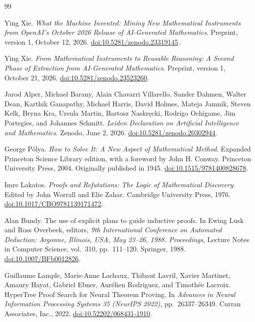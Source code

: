 \begin{thebibliography}{99}

Ying Xie.
\emph{What the Machine Invented: Mining New Mathematical Instruments from OpenAI's October 2026 Release of AI-Generated Mathematics}.
Preprint, version 1, October 12, 2026.
\href{https://doi.org/10.5281/zenodo.23319145}{doi:10.5281/zenodo.23319145}.

Ying Xie.
\emph{From Mathematical Instruments to Reusable Reasoning: A Second Phase of Extraction from AI-Generated Mathematics}.
Preprint, version 1, October 21, 2026.
\href{https://doi.org/10.5281/zenodo.23523260}{doi:10.5281/zenodo.23523260}.

Jarod Alper, Michael Barany, Alain Chavarri Villarello, Sander Dahmen, Walter Dean, Karthik Ganapathy, Michael Harris, David Holmes, Mateja Jamnik, Steven Kelk, Bryna Kra, Ursula Martin, Bartosz Naskr\k{e}cki, Rodrigo Ochigame, Jim Portegies, and Johannes Schmitt.
\emph{Leiden Declaration on Artificial Intelligence and Mathematics}.
Zenodo, June 2, 2026.
\href{https://doi.org/10.5281/zenodo.20302944}{doi:10.5281/zenodo.20302944}.

George P\'olya.
\emph{How to Solve It: A New Aspect of Mathematical Method}.
Expanded Princeton Science Library edition, with a foreword by John H. Conway. Princeton University Press, 2004. Originally published in 1945.
\href{https://doi.org/10.1515/9781400828678}{doi:10.1515/9781400828678}.

Imre Lakatos.
\emph{Proofs and Refutations: The Logic of Mathematical Discovery}.
Edited by John Worrall and Elie Zahar. Cambridge University Press, 1976.
\href{https://doi.org/10.1017/CBO9781139171472}{doi:10.1017/CBO9781139171472}.

Alan Bundy.
The use of explicit plans to guide inductive proofs.
In Ewing Lusk and Ross Overbeek, editors, \emph{9th International Conference on Automated Deduction: Argonne, Illinois, USA, May 23--26, 1988. Proceedings},
Lecture Notes in Computer Science, vol.\ 310, pp.\ 111--120. Springer, 1988.
\href{https://doi.org/10.1007/BFb0012826}{doi:10.1007/BFb0012826}.

Guillaume Lample, Marie-Anne Lachaux, Thibaut Lavril, Xavier Martinet, Amaury Hayat, Gabriel Ebner, Aur\'elien Rodriguez, and Timoth\'ee Lacroix.
HyperTree Proof Search for Neural Theorem Proving.
In \emph{Advances in Neural Information Processing Systems 35 (NeurIPS 2022)}, pp.\ 26337--26349. Curran Associates, Inc., 2022.
\href{https://doi.org/10.52202/068431-1910}{doi:10.52202/068431-1910}.


\end{thebibliography}
